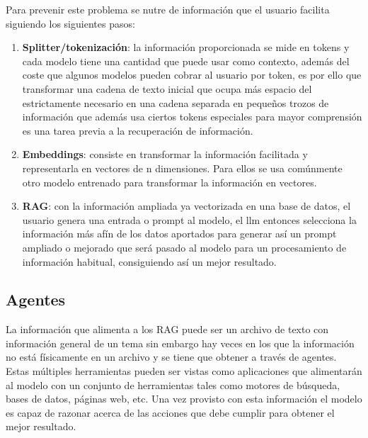 	Para prevenir este problema se nutre de información que el usuario facilita siguiendo los siguientes pasos:
	\begin{enumerate}
		\item \textbf{Splitter/tokenización}: la información proporcionada se mide en tokens y cada modelo tiene una cantidad que puede usar como contexto, además del coste que algunos modelos pueden cobrar al usuario por token, es por ello que transformar una cadena de texto inicial que ocupa más espacio del estrictamente necesario en una cadena separada en pequeños trozos de información que además usa ciertos tokens especiales para mayor comprensión es una tarea previa a la recuperación de información.
	
		\item \textbf{Embeddings}: consiste en transformar la información facilitada y representarla en vectores de n dimensiones. Para ellos se usa comúnmente otro modelo entrenado para transformar la información en vectores.
		
		
		\item \textbf{RAG}: con la información ampliada ya vectorizada en una base de datos, el usuario genera una entrada o prompt al modelo, el \acrshort{llm} entonces selecciona la información más afín de los datos aportados para generar así un prompt ampliado o mejorado que será pasado al modelo para un procesamiento de información habitual, consiguiendo así un mejor resultado.
		
	\end{enumerate}
	

	
	
	\subsection{Agentes}
	\label{sec:agentes}
	La información que alimenta a los RAG puede ser un archivo de texto con información general de un tema sin embargo hay veces en los que la información no está físicamente en un archivo y se tiene que obtener a través de agentes.
	Estas múltiples herramientas pueden ser vistas como aplicaciones que alimentarán al modelo con un conjunto de herramientas tales como motores de búsqueda, bases de datos, páginas web, etc. Una vez provisto con esta información el modelo es capaz de razonar acerca de las acciones que debe cumplir para obtener el mejor resultado.


